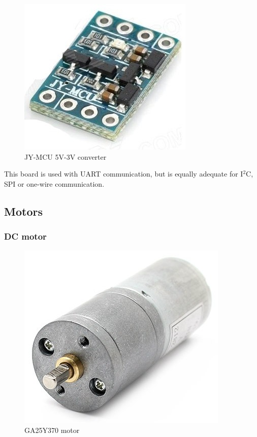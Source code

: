 			\begin{figure}[H]
					\centering
					\includegraphics[scale=0.4]{images/ProjectComponents/logic-voltage.jpg}
					\caption{JY-MCU 5V-3V converter }
					\label{}
			\end{figure}
			\bigskip

		This board is used with UART communication, but is equally adequate for I$^2$C, SPI or one-wire communication.
 
\subsection{Motors}

	\subsubsection{DC motor}
	
		\begin{figure}[H]
			\centering
			\includegraphics[scale=0.4]{images/ProjectComponents/motor.jpg}
			\caption{GA25Y370 motor }
			\label{}
	\end{figure}
	\bigskip

